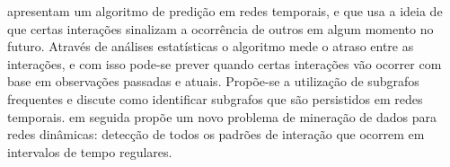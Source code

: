\cite{lahiri2007} apresentam um algoritmo de predição em redes temporais, e que usa a ideia de que certas
interações sinalizam a ocorrência de outros em algum momento no futuro. Através de análises estatísticas
o algoritmo mede o atraso entre as interações, e com isso pode-se prever quando certas interações vão ocorrer
com base em observações passadas e atuais. Propõe-se a utilização de subgrafos frequentes e discute
como identificar subgrafos que são persistidos em redes temporais.
\cite{lahiri2008} em seguida propõe um novo problema de mineração de dados para redes dinâmicas:
detecção de todos os padrões de interação que ocorrem em intervalos de tempo regulares.











